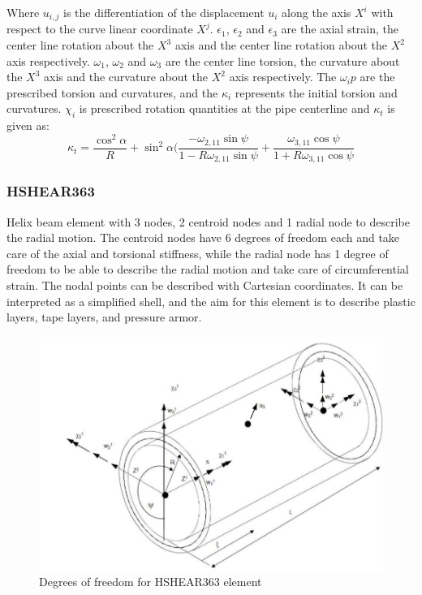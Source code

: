 \noindent Where $u_{i,j}$ is the differentiation of the displacement $u_i$ along the axis $X^i$ with respect to the curve linear coordinate $X^j$. $\epsilon_1$, $\epsilon_2$ and $\epsilon_3$ are the axial strain, the center line rotation about the $X^3$ axis and the center line rotation about the $X^2$ axis respectively. $\omega_1$, $\omega_2$ and $\omega_3$ are the center line torsion, the curvature about the $X^3$ axis and the curvature about the $X^2$ axis respectively. The $\omega_ip$ are the prescribed torsion and curvatures, and the $\kappa_i$ represents the initial torsion and curvatures. $\chi_i$ is prescribed rotation quantities at the pipe centerline and $\kappa_t$ is given as:
\begin{equation}
    \kappa_t=\frac{\cos^2\alpha}{R}+\sin^2 \alpha (\frac{-\omega_{2,11}\sin \psi }{1-R \omega_{2,11} \sin \psi} + \frac{\omega_{3,11}\cos \psi }{1+R \omega_{3,11} \cos \psi}
\end{equation}

\subsubsection{HSHEAR363}
Helix beam element with 3 nodes, 2 centroid nodes and 1 radial node to describe the radial motion. The centroid nodes have 6 degrees of freedom each and take care of the axial and torsional stiffness, while the radial node has 1 degree of freedom to be able to describe the radial motion and take care of circumferential strain.  The nodal points can be described with Cartesian coordinates. It can be interpreted as a simplified shell, and the aim for this element is to describe plastic layers, tape layers, and pressure armor. 

\begin{figure}[H]
\centering
\includegraphics[scale=0.5]{figures/hshear363}
\caption[$\; \:$HSHEAR363]{Degrees of freedom for HSHEAR363 element \cite{Bflextheory2013} }
 \label{fig:363}
\end{figure}

